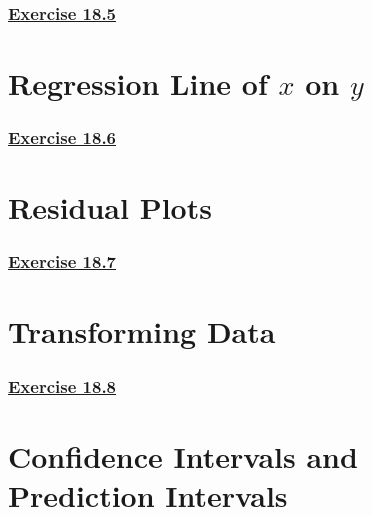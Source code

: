 \documentclass[
  11pt,
]{book}
\begin{document}
\subsubsection*{\texorpdfstring{\hyperref[ex185a]{Exercise 18.5}}{Exercise 18.5}}\label{exercise-18.5}

\section{\texorpdfstring{Regression Line of \(x\) on \(y\)}{Regression Line of x on y}}\label{regression-line-of-x-on-y}

\subsubsection*{\texorpdfstring{\hyperref[ex186a]{Exercise 18.6}}{Exercise 18.6}}\label{exercise-18.6}

\section{Residual Plots}\label{residual-plots}

\subsubsection*{\texorpdfstring{\hyperref[ex187a]{Exercise 18.7}}{Exercise 18.7}}\label{exercise-18.7}

\section{Transforming Data}\label{transforming-data}

\subsubsection*{\texorpdfstring{\hyperref[ex188a]{Exercise 18.8}}{Exercise 18.8}}\label{exercise-18.8}

\section{Confidence Intervals and Prediction Intervals}\label{confidence-intervals-and-prediction-intervals}
\end{document}
